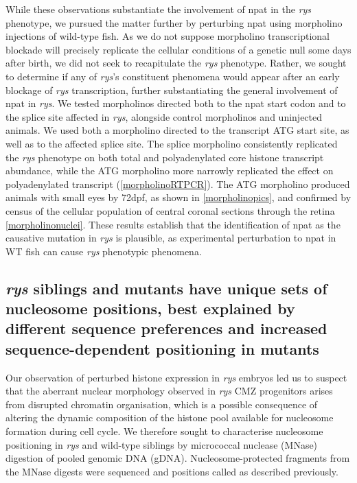 While these observations substantiate the involvement of npat in the \textit{rys} phenotype, we pursued the matter further by perturbing npat using morpholino injections of wild-type fish. As we do not suppose morpholino transcriptional blockade will precisely replicate the cellular conditions of a genetic null some days after birth, we did not seek to recapitulate the \textit{rys} phenotype. Rather, we sought to determine if any of \textit{rys}'s constituent phenomena would appear after an early blockage of \textit{rys} transcription, further substantiating the general involvement of npat in \textit{rys}. We tested morpholinos directed both to the npat start codon and to the splice site affected in \textit{rys}, alongside control morpholinos and uninjected animals. We used both a morpholino directed to the transcript ATG start site, as well as to the affected splice site. The splice morpholino consistently replicated the \textit{rys} phenotype on both total and polyadenylated core histone transcript abundance, while the ATG morpholino more narrowly replicated the effect on polyadenylated transcript (\autoref{morpholinoRTPCR}). The ATG morpholino produced animals with small eyes by 72dpf, as shown in \autoref{morpholinopics}, and confirmed by census of the cellular population of central coronal sections through the retina \autoref{morpholinonuclei}. These results establish that the identification of npat as the causative mutation in \textit{rys} is plausible, as experimental perturbation to npat in WT fish can cause \textit{rys} phenotypic phenomena. 

\subsection{\textit{rys} siblings and mutants have unique sets of nucleosome positions, best explained by different sequence preferences and increased sequence-dependent positioning in mutants}
 Our observation of perturbed histone expression in \textit{rys} embryos led us to suspect that the aberrant nuclear morphology observed in \textit{rys} CMZ progenitors arises from disrupted chromatin organisation, which is a possible consequence of altering the dynamic composition of the histone pool available for nucleosome formation during cell cycle. We therefore sought to characterise nucleosome positioning in \textit{rys} and wild-type siblings by micrococcal nuclease (MNase) digestion of pooled genomic DNA (gDNA). Nucleosome-protected fragments from the MNase digests were sequenced and positions called as described previously.


